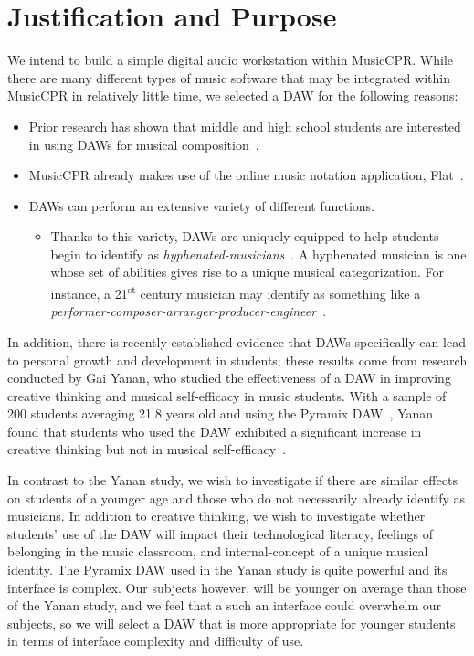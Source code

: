 \documentclass[manuscript,screen,review]{acmart}
\begin{document}
\section{Justification and Purpose}
We intend to build a simple digital audio workstation within MusicCPR.
While there are many different types of music software that may be integrated within MusicCPR in relatively little time, we selected a DAW for the following reasons:

\begin{itemize}
    \item Prior research has shown that middle and high school students are interested in using DAWs for musical composition~\cite{PendergastRobinson}.
    \item MusicCPR already makes use of the online music notation application, Flat~\cite{Flat}.
    \item DAWs can perform an extensive variety of different functions.
    \begin{itemize}
        \item Thanks to this variety, DAWs are uniquely equipped to help students begin to identify as \textit{hyphenated-musicians}~\cite{Tobias}. A hyphenated musician is one whose set of abilities gives rise to a unique musical categorization. For instance, a 21\textsuperscript{st} century musician may identify as something like a \textit{performer-composer-arranger-producer-engineer}~\cite{Pendergast}.
    \end{itemize}
\end{itemize}

In addition, there is recently established evidence that DAWs specifically can lead to personal growth and development in students; these results come from research conducted by Gai Yanan, who studied the effectiveness of a DAW in improving creative thinking and musical self-efficacy in music students.
With a sample of 200 students averaging 21.8 years old and using the Pyramix DAW~\cite{Pyramix}, Yanan found that students who used the DAW exhibited a significant increase in creative thinking but not in musical self-efficacy~\cite{Yanan24}.

In contrast to the Yanan study, we wish to investigate if there are similar effects on students of a younger age and those who do not necessarily already identify as musicians. 
In addition to creative thinking, we wish to investigate whether students' use of the DAW will impact their technological literacy, feelings of belonging in the music classroom, and internal-concept of a unique musical identity.
The Pyramix DAW used in the Yanan study is quite powerful and its interface is complex.
Our subjects however, will be younger on average than those of the Yanan study, and we feel that a such an interface could overwhelm our subjects, so we will select a DAW that is more appropriate for younger students in terms of interface complexity and difficulty of use.
\end{document}
